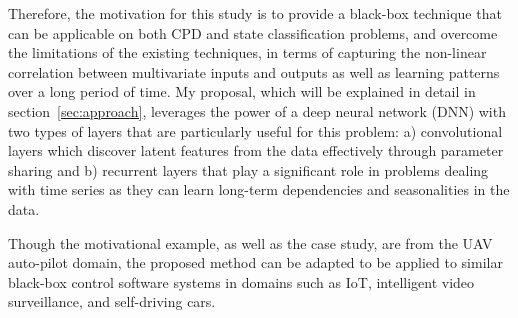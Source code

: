 Therefore, the motivation for this study is to provide a black-box technique that can be applicable on both CPD and state classification problems, and overcome the limitations of the existing techniques, in terms of capturing the non-linear correlation between multivariate inputs and outputs as well as learning patterns over a long period of time. My proposal, which will be explained in detail in section~\ref{sec:approach}, leverages the power of a deep neural network (DNN) with two types of layers that are particularly useful for this problem: a) convolutional layers which discover latent features from the data effectively through parameter sharing and b) recurrent layers that play a significant role in problems dealing with time series as they can learn long-term dependencies and seasonalities in the data. 

Though the motivational example, as well as the case study, are from the UAV auto-pilot domain, the proposed method can be adapted to be applied to similar black-box control software systems in domains such as IoT, intelligent video surveillance, and self-driving cars.